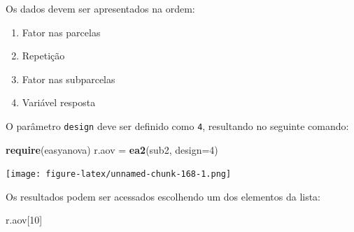 \documentclass[
]{article}
\newenvironment{Shaded}{\begin{snugshade}}{\end{snugshade}}
\newcommand{\DataTypeTok}[1]{\textcolor[rgb]{0.13,0.29,0.53}{#1}}
\newcommand{\DecValTok}[1]{\textcolor[rgb]{0.00,0.00,0.81}{#1}}
\newcommand{\KeywordTok}[1]{\textcolor[rgb]{0.13,0.29,0.53}{\textbf{#1}}}
\newcommand{\NormalTok}[1]{#1}
\newcommand{\StringTok}[1]{\textcolor[rgb]{0.31,0.60,0.02}{#1}}
\providecommand{\tightlist}{%
  \setlength{\itemsep}{0pt}\setlength{\parskip}{0pt}}
\begin{document}
Os dados devem ser apresentados na ordem:

\begin{enumerate}
\def\labelenumi{\arabic{enumi}.}
\tightlist
\item
  Fator nas parcelas
\item
  Repetição
\item
  Fator nas subparcelas
\item
  Variável resposta
\end{enumerate}

O parâmetro \texttt{design} deve ser definido como \texttt{4}, resultando no seguinte comando:

\begin{Shaded}
\begin{Highlighting}[]
\KeywordTok{require}\NormalTok{(easyanova)}
\NormalTok{r.aov =}\StringTok{ }\KeywordTok{ea2}\NormalTok{(sub2, }\DataTypeTok{design=}\DecValTok{4}\NormalTok{)}
\end{Highlighting}
\end{Shaded}

\texttt{[image: figure-latex/unnamed-chunk-168-1.png]}

Os resultados podem ser acessados escolhendo um dos elementos da lista:

\begin{Shaded}
\begin{Highlighting}[]
\NormalTok{r.aov[}\DecValTok{10}\NormalTok{]}
\end{Highlighting}
\end{Shaded}
\end{document}
